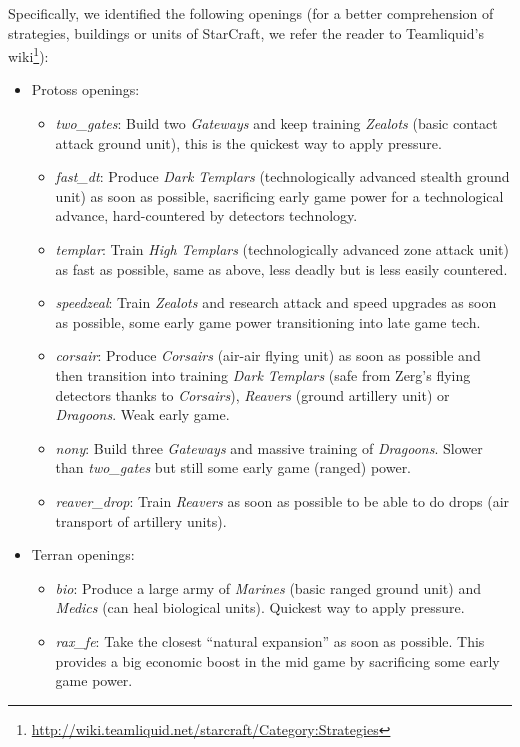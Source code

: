 \documentclass[journal]{IEEEtran}
\begin{document}
Specifically, we identified the following openings (for a better comprehension of strategies, buildings or units of StarCraft, we refer the reader to Teamliquid's wiki\footnote{\url{http://wiki.teamliquid.net/starcraft/Category:Strategies}}):
\begin{itemize}
  \item Protoss openings:
  \begin{itemize}
    \item \emph{two\_gates}: Build two \emph{Gateways} and keep training \emph{Zealots} (basic contact attack ground unit), this is the quickest way to apply pressure.
    \item \emph{fast\_dt}: Produce \emph{Dark Templars} (technologically advanced stealth ground unit) as soon as possible, sacrificing early game power for a technological advance, hard-countered by detectors technology.
    \item \emph{templar}: Train \emph{High Templars} (technologically advanced zone attack unit) as fast as possible, same as above, less deadly but is less easily countered.
    \item \emph{speedzeal}: Train \emph{Zealots} and research attack and speed upgrades as soon as possible, some early game power transitioning into late game tech.
    \item \emph{corsair}: Produce \emph{Corsairs} (air-air flying unit) as soon as possible and then transition into training \emph{Dark Templars} (safe from Zerg's flying detectors thanks to \emph{Corsairs}), \emph{Reavers} (ground artillery unit) or \emph{Dragoons}. Weak early game.
    \item \emph{nony}: Build three \emph{Gateways} and massive training of \emph{Dragoons}. Slower than \emph{two\_gates} but still some early game (ranged) power.
    \item \emph{reaver\_drop}: Train \emph{Reavers} as soon as possible to be able to do drops (air transport of artillery units).
  \end{itemize}
  \item Terran openings:
  \begin{itemize}
    \item \emph{bio}: Produce a large army of \emph{Marines} (basic ranged ground unit) and \emph{Medics} (can heal biological units). Quickest way to apply pressure.
    \item \emph{rax\_fe}: Take the closest ``natural expansion'' as soon as possible. This provides a big economic boost in the mid game by sacrificing some early game power.

\end{itemize}
\end{itemize}
\end{document}
